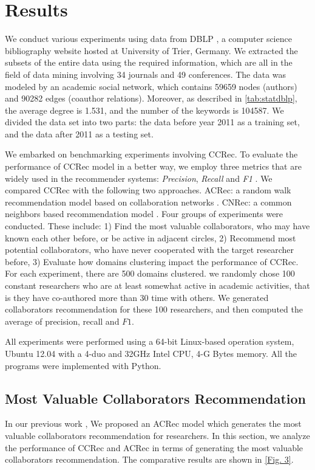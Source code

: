 \documentclass[10pt]{article}
\begin{document}
\section*{Results}
We conduct various experiments using data from DBLP \cite{Ley:DBLP}, a computer science bibliography website hosted at University of Trier, Germany. We extracted the subsets of the entire data using the required information, which are all in the field of data mining involving 34 journals and 49 conferences. The data was modeled by an academic social network, which contains 59659 nodes (authors) and 90282 edges (coauthor relations). Moreover, as described in \autoref{tab:statdblp}, the average degree is 1.531, and the number of the keywords is 104587. We divided the data set into two parts: the data before year 2011 as a training set, and the data after 2011 as a testing set.

We embarked on benchmarking experiments involving CCRec. To evaluate the performance of CCRec model in a better way, we employ three metrics that are widely used in the recommender systems: \emph{Precision}, \emph{Recall} and \emph{F1} \cite{shani2011evaluating}. We compared CCRec with the following two approaches. ACRec: a random walk recommendation model based on collaboration networks \cite{li2014acrec}. CNRec: a common neighbors based recommendation model \cite{lopes2010collaboration}. Four groups of experiments were conducted. These include: 1) Find the most valuable collaborators, who may have known each other before, or be active in adjacent circles, 2) Recommend most potential collaborators, who have never cooperated with the target researcher before, 3) Evaluate how domains clustering impact the performance of CCRec. For each experiment, there are 500 domains clustered. we randomly chose 100 constant researchers who are at least somewhat active in academic activities, that is they have co-authored more than 30 time with others. We generated collaborators recommendation for these 100 researchers, and then computed the average of precision, recall and $F1$.


All experiments were performed using a 64-bit Linux-based operation system, Ubuntu 12.04 with a 4-duo and 32GHz Intel CPU, 4-G Bytes memory. All the programs were implemented with Python.

\subsection*{Most Valuable Collaborators Recommendation}
In our previous work \cite{li2014acrec}, We proposed an ACRec model which generates the most valuable collaborators recommendation for researchers. In this section, we analyze the performance of CCRec and ACRec in terms of generating the most valuable collaborators recommendation. The comparative results are shown in \autoref{Fig. 3}.
\end{document}
